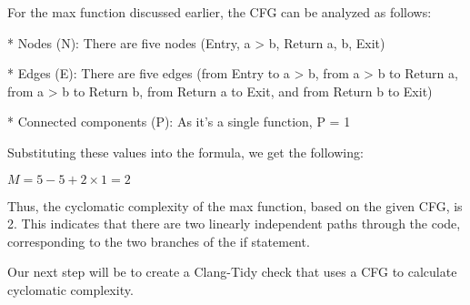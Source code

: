 For the max function discussed earlier, the CFG can be analyzed as follows:

\begin{markdown}
* Nodes (N): There are five nodes (Entry, a > b, Return a, b, Exit)

* Edges (E): There are five edges (from Entry to a > b, from a > b to Return a, from a > b to Return b, from Return a to Exit, and from Return b to Exit)

* Connected components (P): As it’s a single function, P = 1
\end{markdown}

Substituting these values into the formula, we get the following:

$ M = 5 − 5 + 2 × 1 = 2$

Thus, the cyclomatic complexity of the max function, based on the given CFG, is 2. This indicates that there are two linearly independent paths through the code, corresponding to the two branches of the if statement.

Our next step will be to create a Clang-Tidy check that uses a CFG to calculate cyclomatic complexity.





































